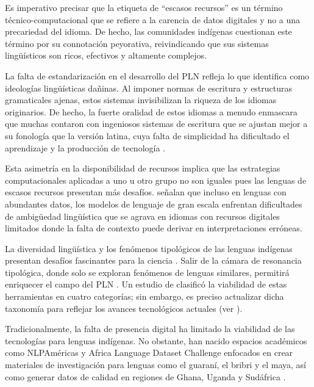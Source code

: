 \documentclass[spanish]{textolivre}
\begin{document}
Es imperativo precisar que la etiqueta de “escasos recursos” es un término técnico-computacional que se refiere a la carencia de datos digitales y no a una precariedad del idioma. De hecho, las comunidades indígenas cuestionan este término por su connotación peyorativa, reivindicando que sus sistemas lingüísticos son ricos, efectivos y altamente complejos.

La falta de estandarización en el desarrollo del PLN refleja lo que \textcite{Gasparotto2026} identifica como ideologías lingüísticas dañinas. Al imponer normas de escritura y estructuras gramaticales ajenas, estos sistemas invisibilizan la riqueza de los idiomas originarios. De hecho, la fuerte oralidad de estos idiomas a menudo enmascara que muchas contaron con ingeniosos sistemas de escritura que se ajustan mejor a su fonología que la versión latina, cuya falta de simplicidad ha dificultado el aprendizaje y la producción de tecnología \cite{Joshi2020}.

Esta asimetría en la disponibilidad de recursos implica que las estrategias computacionales aplicadas a uno u otro grupo no son iguales pues las lenguas de escasos recursos presentan más desafíos. \textcite{Moraes2025} señalan que incluso en lenguas con abundantes datos, los modelos de lenguaje de gran escala enfrentan dificultades de ambigüedad lingüística que se agrava en idiomas con recursos digitales limitados donde la falta de contexto puede derivar en interpretaciones erróneas.

La diversidad lingüística y los fenómenos tipológicos de las lenguas indígenas presentan desafíos fascinantes para la ciencia \cite{GonzalezSantillan2021,Mager2018}. Salir de la cámara de resonancia tipológica, donde solo se exploran fenómenos de lenguas similares, permitirá enriquecer el campo del PLN \cite{Joshi2020,Ward2018}. Un estudio de \textcite{Littell2018} clasificó la viabilidad de estas herramientas en cuatro categorías; sin embargo, es preciso actualizar dicha taxonomía para reflejar los avances tecnológicos actuales (ver ).

Tradicionalmente, la falta de presencia digital ha limitado la viabilidad de las tecnologías para lenguas indígenas. No obstante, han nacido espacios académicos como NLPAméricas \cite{NLPA2021} y Africa Language Dataset Challenge \cite{AI4D2019} enfocados en crear materiales de investigación para lenguas como el guaraní, el bribri y el maya, así como generar datos de calidad en regiones de Ghana, Uganda y Sudáfrica \cite{Chiruzzo2024,Siminyu2021}.
\end{document}
